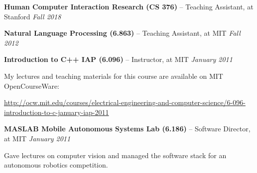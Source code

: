 \documentclass[margin,line]{resume}
\begin{document}
\begin{resume}
\vspace{-8mm}

\textbf{Human Computer Interaction Research (CS 376)} -- Teaching Assistant, at Stanford \hfill \textsl{Fall 2018} \\

\vspace{-8mm}

\textbf{Natural Language Processing (6.863)} -- Teaching Assistant, at MIT \hfill \textsl{Fall 2012} \\

\vspace{-8mm}

\textbf{Introduction to C++ IAP (6.096)} -- Instructor, at MIT \hfill \textsl{January 2011}\\

\vspace{-8mm}

My lectures and teaching materials for this course are available on MIT OpenCourseWare:\\

\vspace{-8mm}

\url{http://ocw.mit.edu/courses/electrical-engineering-and-computer-science/6-096-introduction-to-c-january-iap-2011} \\

\vspace{-7mm}

\textbf{MASLAB Mobile Autonomous Systems Lab (6.186)} -- Software Director, at MIT \hfill \textsl{January 2011}\\

\vspace{-8mm}

Gave lectures on computer vision and managed the software stack for an autonomous robotics competition.


\end{resume}
\end{document}
